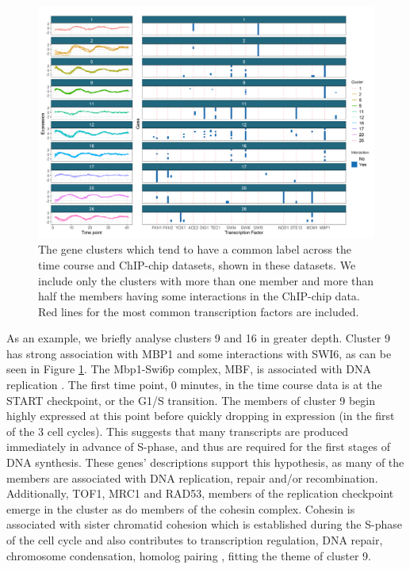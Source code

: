 \documentclass{article}
\begin{document}
\begin{figure}
	\centering
	\includegraphics[scale=0.62]{./SupplementaryMaterial/Images/Yeast/timecourseChIPchipFused.png}
	\caption{The gene clusters which tend to have a common label across the time course and ChIP-chip datasets, shown in these datasets. We include only the clusters with more than one member and more than half the members having some interactions in the ChIP-chip data. Red lines for the most common transcription factors are included.}
	\label{fig:timepointChIPchipFused}
\end{figure}

As an example, we briefly analyse clusters 9 and 16 in greater depth. Cluster 9 has strong association with MBP1 and some interactions with SWI6, as can be seen in Figure \ref{fig:timepointChIPchipFused}. The Mbp1-Swi6p complex, MBF, is associated with DNA replication \citep{iyer2001genomic}. The first time point, 0 minutes, in the time course data is at the START checkpoint, or the G1/S transition. The members of cluster 9 begin highly expressed at this point before quickly dropping in expression (in the first of the 3 cell cycles). This suggests that many transcripts are produced immediately in advance of S-phase, and thus are required for the first stages of DNA synthesis. 
These genes' descriptions \citep[found using \texttt{org.Sc.sgd.db},][and shown in Table 3 of the Supplementary Material]{carlson2014org} support this hypothesis, as many of the members are associated with DNA replication, repair and/or recombination. Additionally, TOF1, MRC1 and RAD53, members of the replication checkpoint \citep{bando2009csm3, lao2018yeast} emerge in the cluster as do members of the cohesin complex. Cohesin is associated with sister chromatid cohesion which is established during the S-phase of the cell cycle \citep{toth1999yeast} and also contributes to transcription regulation, DNA repair, chromosome condensation, homolog pairing \citep{mehta2013cohesin}, fitting the theme of cluster 9.
\end{document}
